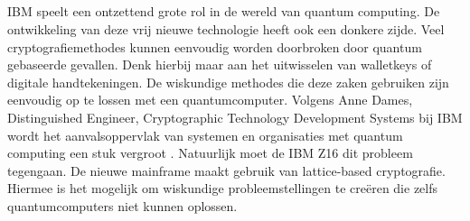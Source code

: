 \subsection{}
\label{sec:Quantum computing en IBM Z16}

IBM speelt een ontzettend grote rol in de wereld van quantum computing. De ontwikkeling van deze vrij nieuwe technologie heeft ook een donkere zijde. Veel cryptografiemethodes kunnen eenvoudig worden doorbroken door quantum gebaseerde gevallen. Denk hierbij maar aan het uitwisselen van walletkeys of digitale handtekeningen. De wiskundige methodes die deze zaken gebruiken zijn eenvoudig op te lossen met een quantumcomputer. Volgens Anne Dames, Distinguished Engineer, Cryptographic Technology Development Systems bij IBM wordt het aanvalsoppervlak van systemen en organisaties met quantum computing een stuk vergroot \autocite{Almekinders2022}. Natuurlijk moet de IBM Z16 dit probleem tegengaan. De nieuwe mainframe maakt gebruik van lattice-based cryptografie. Hiermee is het mogelijk om wiskundige probleemstellingen te creëren die zelfs quantumcomputers niet kunnen oplossen. 













